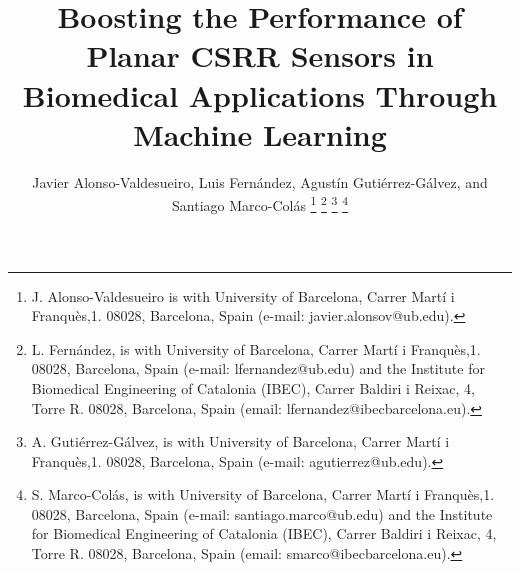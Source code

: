 \documentclass[journal,twoside,web]{ieeecolor}
\begin{document}
\title{Boosting the Performance of Planar CSRR Sensors in Biomedical Applications Through Machine Learning}
\author{Javier Alonso-Valdesueiro, Luis Fernández, Agustín Gutiérrez-Gálvez, and Santiago Marco-Colás
\thanks{J. Alonso-Valdesueiro is with University of Barcelona, Carrer Martí i Franquès,1. 08028, Barcelona, Spain (e-mail: javier.alonsov@ub.edu). }
\thanks{L. Fernández, is with University of Barcelona, Carrer Martí i Franquès,1. 08028, Barcelona, Spain (e-mail: lfernandez@ub.edu) and the Institute for Biomedical Engineering of Catalonia (IBEC), Carrer Baldiri i Reixac, 4, Torre R. 08028, Barcelona, Spain (email: lfernandez@ibecbarcelona.eu).}
\thanks{A. Gutiérrez-Gálvez, is with University of Barcelona, Carrer Martí i Franquès,1. 08028, Barcelona, Spain (e-mail: agutierrez@ub.edu).}
\thanks{S. Marco-Colás, is with University of Barcelona, Carrer Martí i Franquès,1. 08028, Barcelona, Spain (e-mail: santiago.marco@ub.edu) and the Institute for Biomedical Engineering of Catalonia (IBEC), Carrer Baldiri i Reixac, 4, Torre R. 08028, Barcelona, Spain (email: smarco@ibecbarcelona.eu).}}
\end{document}
